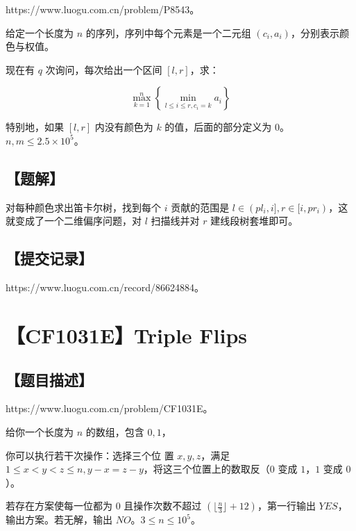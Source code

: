 \documentclass[UTF8,12pt,a4paper]{ctexart}
\begin{document}
	https://www.luogu.com.cn/problem/P8543。
	
	给定一个长度为 $n$ 的序列，序列中每个元素是一个二元组 $(c_i,a_i)$，分别表示颜色与权值。
	
	现在有 $q$ 次询问，每次给出一个区间 $[l,r]$，求：
	
	$$\max\limits_{k=1}^n \left\{\min\limits_{l\le i \le r,c_i=k} a_i\right\}$$
	
	特别地，如果 $[l,r]$ 内没有颜色为 $k$ 的值，后面的部分定义为 $0$。$n,m\le 2.5\times 10^5$。
	
	\subsection*{【题解】}
	
	对每种颜色求出笛卡尔树，找到每个 $i$ 贡献的范围是 $l\in(pl_i,i],r\in[i,pr_i)$，这就变成了一个二维偏序问题，对 $l$ 扫描线并对 $r$ 建线段树套堆即可。
	
	\subsection*{【提交记录】}
	
	https://www.luogu.com.cn/record/86624884。
	
	
	\section*{【CF1031E】Triple Flips}
	
	\subsection*{【题目描述】}
	
	https://www.luogu.com.cn/problem/CF1031E。
	
	给你一个长度为 $n$ 的数组，包含 $0,1$，
	
	你可以执行若干次操作：选择三个位 置 $x,y,z$，满足 $1\le x<y<z\le n,y-x=z-y$，将这三个位置上的数取反（$0$ 变成 $1$，$1$ 变成 $0$）。
	
	若存在方案使每一位都为 $0$ 且操作次数不超过 $(\lfloor \frac{n}{3} \rfloor + 12)$，第一行输出 $YES$，输出方案。若无解，输出 $NO$。$3\le n\le 10^5$。
	
\end{document}
